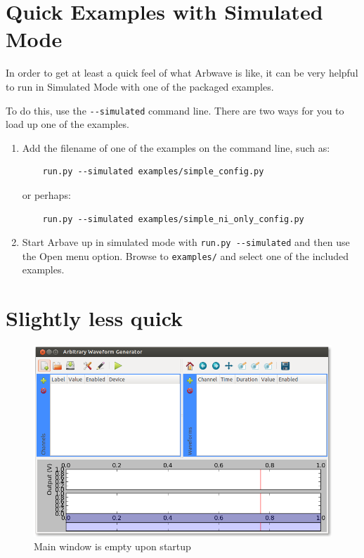 
\section{Quick Examples with Simulated Mode}

In order to get at least a quick feel of what Arbwave is like, it can be very
helpful to run in Simulated Mode with one of the packaged examples.

To do this, use the \verb|--simulated| command line.  There are two ways for you
to load up one of the examples.
\begin{enumerate}
  \item Add the filename of one of the examples on the command line, such as:\\
    \begin{verbatim}
    run.py --simulated examples/simple_config.py
    \end{verbatim}
    or perhaps:
    \begin{verbatim}
    run.py --simulated examples/simple_ni_only_config.py
    \end{verbatim}
  \item Start Arbave up in simulated mode with \verb|run.py --simulated| and
  then use the Open menu option.  Browse to \verb|examples/| and select one of
  the included examples.
\end{enumerate}



\section{Slightly less quick}
\begin{figure}[hb]
  \centerline{\includegraphics[width=\textwidth]{figures/main-empty}}
  \caption{Main window is empty upon startup}
  \label{fig:quick:main-empty}
\end{figure}



